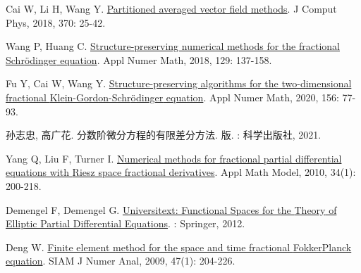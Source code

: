 \begin{thebibliography}{79}
    Cai W, Li H, Wang Y.
    \newblock \href{https://linkinghub.elsevier.com/retrieve/pii/S0021999118303012}{Partitioned averaged vector field methods}\allowbreak[J].
    \newblock J Comput Phys, 2018, 370: 25-42.
    
    Wang P, Huang C.
    \newblock \href{https://linkinghub.elsevier.com/retrieve/pii/S0168927418300709}{Structure-preserving numerical methods for the fractional {{Schr{\"o}dinger}} equation}\allowbreak[J].
    \newblock Appl Numer Math, 2018, 129: 137-158.
    
    Fu Y, Cai W, Wang Y.
    \newblock \href{https://www.sciencedirect.com/science/article/pii/S0168927420301264}{Structure-preserving algorithms for the two-dimensional fractional {{Klein-Gordon-Schr{\"o}dinger}} equation}\allowbreak[J].
    \newblock Appl Numer Math, 2020, 156: 77-93.
    
    {孙志忠}, {高广花}.
    \newblock 分数阶微分方程的有限差分方法\allowbreak[M].
     版.
    : {科学出版社}, 2021.
    
    Yang Q, Liu F, Turner I.
    \newblock \href{https://www.sciencedirect.com/science/article/pii/S0307904X09001127}{Numerical methods for fractional partial differential equations with {{Riesz}} space fractional derivatives}\allowbreak[J].
    \newblock Appl Math Model, 2010, 34\allowbreak (1): 200-218.
    
    Demengel F, Demengel G.
    \newblock \href{http://link.springer.com/10.1007/978-1-4471-2807-6}{Universitext: Functional {{Spaces}} for the {{Theory}} of {{Elliptic Partial Differential Equations}}}\allowbreak[M].
    : {Springer}, 2012.
    
    Deng W.
    \newblock \href{https://doi.org/10.1137/080714130}{Finite element method for the space and time fractional {{Fokker}}{\textendash}{{Planck}} equation}\allowbreak[J].
    \newblock SIAM J Numer Anal, 2009, 47\allowbreak (1): 204-226.
    

\end{thebibliography}

